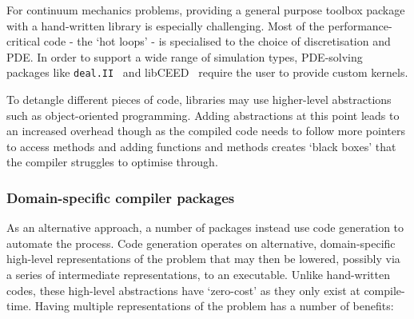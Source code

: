 \documentclass[thesis]{subfiles}
\begin{document}
For continuum mechanics problems, providing a general purpose toolbox package with a hand-written library is especially challenging.
Most of the performance-critical code - the `hot loops' - is specialised to the choice of discretisation and PDE.
In order to support a wide range of simulation types, PDE-solving packages like \texttt{deal.II}~\cite{dealII95,dealii2019design} and libCEED~\cite{brownLibCEEDFastAlgebra2021} require the user to provide custom kernels.


To detangle different pieces of code, libraries may use higher-level abstractions such as object-oriented programming.
Adding abstractions at this point leads to an increased overhead though as the compiled code needs to follow more pointers to access methods and adding functions and methods creates `black boxes' that the compiler struggles to optimise through.

\subsubsection{Domain-specific compiler packages}

As an alternative approach, a number of packages instead use code generation to automate the process.
Code generation operates on alternative, domain-specific high-level representations of the problem that may then be lowered, possibly via a series of intermediate representations, to an executable.
Unlike hand-written codes, these high-level abstractions have `zero-cost' as they only exist at compile-time.
Having multiple representations of the problem has a number of benefits:
\end{document}
